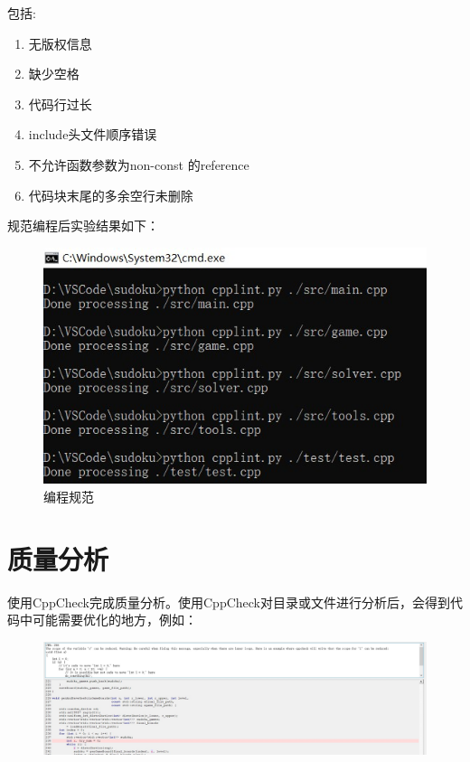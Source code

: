 \documentclass[a4paper]{article}
\begin{document}
包括:

\begin{enumerate}
	\item 无版权信息
	\item 缺少空格
	\item 代码行过长
	\item include头文件顺序错误
	\item 不允许函数参数为non-const 的reference
	\item 代码块末尾的多余空行未删除
\end{enumerate}

规范编程后实验结果如下：

\begin{figure}[!ht]
  \centering
  \includegraphics[scale=0.9]{images/cpplint.jpg}
  \caption{编程规范}
  \label{fig:cpplint}
\end{figure}

\section{质量分析}
使用CppCheck完成质量分析。使用CppCheck对目录或文件进行分析后，会得到代码中可能需要优化的地方，例如：

\begin{figure}[!ht]
  \centering
  \includegraphics[scale=0.4]{images/ncppcheck.jpg}
  \label{fig:ncppcheck}
\end{figure}
\end{document}
